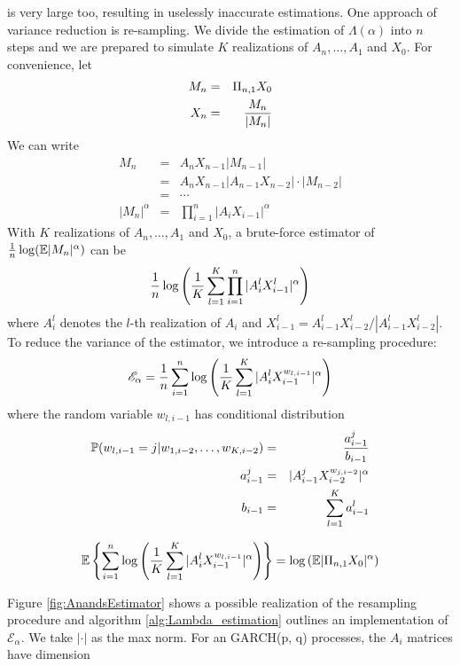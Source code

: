 \documentclass[aoas,preprint]{imsart}
\numberwithin{equation}{section}
\theoremstyle{plain}
\begin{document}
is very large too, resulting in uselessly inaccurate estimations. One
approach of variance reduction is re-sampling. We divide the
estimation of $\Lambda(\alpha)$ into $n$ steps and we are prepared to
simulate $K$ realizations of $A_n, \dots, A_1$ and $X_0$. For
convenience, let
\begin{eqnarray*}
  M_n &=& \Pi_{n, 1} X_0 \\
  X_n &=& {M_n \over |M_n|}
\end{eqnarray*}
We can write
\begin{eqnarray*}
  M_n &=& A_n X_{n - 1} |M_{n - 1}| \\
  &=& A_n X_{n - 1} |A_{n-1} X_{n-2}| \cdot |M_{n-2}| \\
  &=& \cdots \\
  |M_n|^\alpha &=& \prod_{i=1}^n |A_i X_{i-1}|^\alpha
\end{eqnarray*}
With $K$ realizations of $A_n, \dots, A_1$ and $X_0$, a brute-force
estimator of ${1 \over n} \log(\E |M_n|^\alpha)$ can be
\[
{1 \over n} \log \left(
  {1 \over K} \sum_{l=1}^K \prod_{i=1}^n |A_i^l X^l_{i-1}|^\alpha
\right)
\]
where $A_i^l$ denotes the $l$-th realization of $A_i$ and
$X^l_{i-1} = A_{i-1}^l X^l_{i-2}/|A_{i-1}^l X^l_{i-2}|$. To reduce the
variance of the estimator, we introduce a re-sampling procedure:
\begin{equation}
  \label{eq:AnandsEstimator}
  \mathscr E_\alpha =
  {1 \over n}
  \sum_{i=1}^n \log \left(
    {1 \over K}\sum_{l=1}^K |A_i^l X^{w_{l, i-1}}_{i-1}|^\alpha
  \right)
\end{equation}
where the random variable $w_{l, i-1}$ has conditional distribution
\begin{eqnarray*}
  \P(w_{l, i-1} = j | w_{1, i-2}, \dots, w_{K, i-2}) &=& {a^j_{i-1} \over b_{i-1}} \\
  a_{i-1}^j &=& |A_{i-1}^j X_{i-2}^{w_{j, i-2}}|^\alpha \\
  b_{i-1} &=& \sum_{l=1}^K a_{i-1}^l
\end{eqnarray*}
\begin{theorem}
  \[
  \E \left\{
    \sum_{i=1}^n \log \left(
      {1 \over K}\sum_{l=1}^K |A_i^l X^{w_{l, i-1}}_{i-1}|^\alpha
    \right)
  \right\} = \log \left(
    \E |\Pi_{n, 1} X_0|^\alpha
  \right)
  \]
\end{theorem}
Figure \ref{fig:AnandsEstimator} shows a possible realization of the
resampling procedure and algorithm \ref{alg:Lambda_estimation}
outlines an implementation of $\mathscr E_\alpha$. We take
$|\cdot|$ as the max norm.
For an GARCH(p, q) processes, the $A_i$ matrices have dimension
\end{document}
